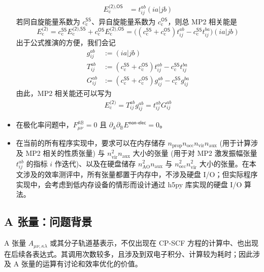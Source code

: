 \begin{itemize}[nosep]
\begin{align}
          E_\mathrm{c}^{\textsf{(2)}, \textsf{OS}} &= t_{ij}^{ab} (ia|jb) 
        \end{align}
        若同自旋能量系数为 $c_\mathrm{c}^\textsf{SS}$、异自旋能量系数为 $c_\mathrm{c}^\textsf{OS}$，则总 MP2 相关能是
        \begin{equation}
          E_\mathrm{c}^{\textsf{(2)}} = c_\mathrm{c}^\textsf{SS} E_\mathrm{c}^{\textsf{(2)}, \textsf{SS}} + c_\mathrm{c}^\textsf{OS} E_\mathrm{c}^{\textsf{(2)}, \textsf{OS}} = \big( (c_\mathrm{c}^\textsf{SS} + c_\mathrm{c}^\textsf{OS}) t_{ij}^{ab} - c_\mathrm{c}^\textsf{SS} t_{ij}^{ba} \big) (ia|jb)
        \end{equation}
        出于公式推演的方便，我们会记
        \begin{align}
          g_{ij}^{ab} &:= (ia|jb) \\
          T_{ij}^{ab} &:= (c_\mathrm{c}^\textsf{SS} + c_\mathrm{c}^\textsf{OS}) t_{ij}^{ab} - c_\mathrm{c}^\textsf{SS} t_{ij}^{ba} \\
          G_{ij}^{ab} &:= (c_\mathrm{c}^\textsf{SS} + c_\mathrm{c}^\textsf{OS}) g_{ij}^{ab} - c_\mathrm{c}^\textsf{SS} g_{ij}^{ba}
        \end{align}
        由此，MP2 相关能还可以写为
        \begin{align}
          E_\mathrm{c}^\textsf{(2)} = T_{ij}^{ab} g_{ij}^{ab} = t_{ij}^{ab} G_{ij}^{ab}
        \end{align}
  \item 在极化率问题中，$F_{\mu \nu}^{\mathbb{AB}} = 0$ 且 $\partial_{\mathbb{A}} \partial_{\mathbb{B}} E^\textsf{non-elec} = 0$。
  \item 在当前的所有程序实现中，要求可以在内存储存 $n_\mathrm{prop} n_\mathrm{occ} n_\mathrm{vir} n_\mathrm{aux}$ (用于计算涉及 MP2 相关的性质张量) 与 $n_\mathrm{vir}^2 n_\mathrm{aux}$ 大小的张量 (用于对 MP2 激发振幅张量 $t_{ij}^{ab}$ 的指标 $i$ 作迭代)、以及在硬盘储存 $n_\mathrm{AO}^2 n_\mathrm{aux}$ 与 $n_\mathrm{occ}^2 n_\mathrm{vir}^2$ 大小的张量。在本文涉及的效率测评中，所有张量都置于内存中，不涉及硬盘 I/O；但实际程序实现中，会考虑到低内存设备的情形而设计通过 h5py 库实现的硬盘 I/O 算法。
\end{itemize}

\subsection{A 张量：问题背景}

A 张量 $A_{\mu \nu, \kappa \lambda}$ 或其分子轨道基表示，不仅出现在 CP-SCF 方程的计算中、也出现在后续各表达式。其调用次数较多，且涉及到双电子积分、计算较为耗时；因此涉及 A 张量的运算有讨论和效率优化的价值。

